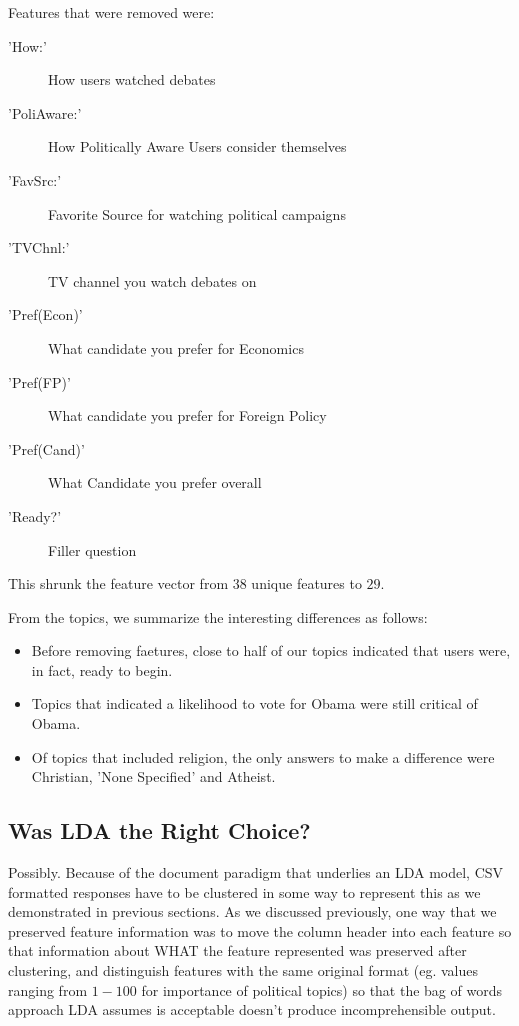 Features that were removed were:
\begin{description}
\item['How:'] How users watched debates
\item['PoliAware:'] How Politically Aware Users consider themselves
\item['FavSrc:'] Favorite Source for watching political campaigns
\item['TVChnl:'] TV channel you watch debates on
\item['Pref(Econ)'] What candidate you prefer for Economics
\item['Pref(FP)'] What candidate you prefer for Foreign Policy
\item['Pref(Cand)'] What Candidate you prefer overall
\item['Ready?'] Filler question
\end{description}
 This shrunk the feature vector from $38$ unique features to $29$.


From the topics, we summarize the interesting differences as follows:
\begin{itemize}
\item Before removing faetures, close to half of our topics indicated that users were, in fact, ready to begin.
\item Topics that indicated a likelihood to vote for Obama were still critical of Obama.
\item Of topics that included religion, the only answers to  make a difference were Christian, 'None Specified' and Atheist.

\end{itemize}



\subsection{Was LDA the Right Choice?}
Possibly. Because of the document paradigm that underlies an LDA model, CSV formatted responses have to be clustered in some way to represent this as we demonstrated in previous sections. As we discussed previously, one way that we preserved feature information was to move the column header into each feature so that information about WHAT the feature represented was preserved after clustering, and distinguish features with the same original format (eg. values ranging from $1 - 100$ for importance of political topics) so that the bag of words approach LDA assumes is acceptable doesn't produce incomprehensible output.

